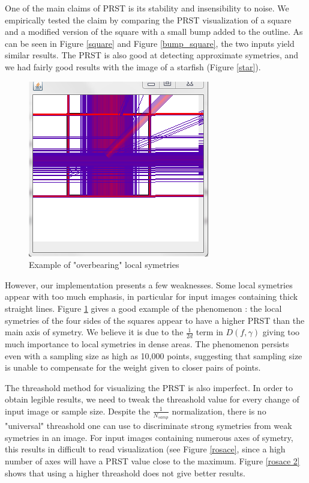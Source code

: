 \documentclass[10pt,a4paper]{article}			%
\begin{document}
One of the main claims of PRST is its stability and insensibility to noise. We empirically tested the claim by comparing the PRST visualization of a square and a modified version of the square with a small bump added to the outline. As can be seen in Figure \ref{square} and Figure \ref{bump_square}, the two inputs yield similar results. The PRST is also good at detecting approximate symetries, and we had fairly good results with the image of a starfish (Figure \ref{star}).

\begin{figure}[h]
\centering
 \includegraphics[scale = 0.7]{img/n_16_sample_1000.png}
 \caption{Example of "overbearing" local symetries}
 \label{thick_square}
\end{figure}

However, our implementation presents a few weaknesses. Some local symetries appear with too much emphasis, in particular for input images containing thick straight lines. Figure \ref{thick_square} gives a good example of the phenomenon : the local symetries of the four sides of the squares appear to have a higher PRST than the main axis of symetry. We believe it is due to the $\frac{1}{2d}$ term in $D(f,\gamma)$ giving too much importance to local symetries in dense areas. The phenomenon persists even with a sampling size as high as 10,000 points, suggesting that sampling size is unable to compensate for the weight given to closer pairs of points.

The threashold method for visualizing the PRST is also imperfect. In order to obtain legible results, we need to tweak the threashold value for every change of input image or sample size. Despite the $\frac{1}{N_{samp}}$ normalization, there is no "universal" threashold one can use to discriminate strong symetries from weak symetries in an image. For input images containing numerous axes of symetry, this results in difficult to read visualization (see Figure \ref{rosace}, since a high number of axes will have a PRST value close to the maximum. Figure \ref{rosace 2} shows that using a higher threashold does not give better results.
\end{document}
